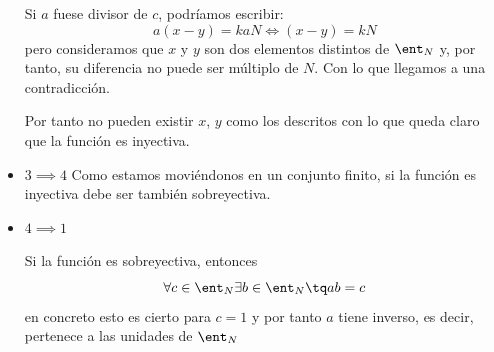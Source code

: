 \begin{problem}[1]
\begin{itemize}
Si $a$ fuese divisor de $c$, podríamos escribir:
\[a(x-y)=kaN \iff (x-y) = kN\]
pero consideramos que $x$ y $y$ son dos elementos distintos de $\ent_N$ y, por tanto, su diferencia no puede ser múltiplo de $N$. Con lo que llegamos a una contradicción.

Por tanto no pueden existir $x$, $y$ como los descritos con lo que queda claro que la función es inyectiva.

\item \textbf{$3 \implies 4$}
Como estamos moviéndonos en un conjunto finito, si la función es inyectiva debe ser también sobreyectiva.

\item \textbf{$4 \implies 1$}

Si la función es sobreyectiva, entonces
\[\forall c \in \ent_N \exists b \in \ent_N \tq ab=c\]
en concreto esto es cierto para $c=1$ y por tanto $a$ tiene inverso, es decir, pertenece a las unidades de $\ent_N$

\end{itemize}

\end{problem}

